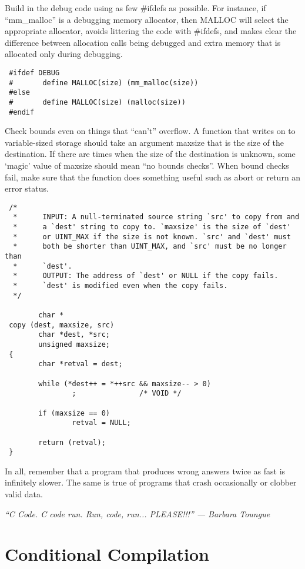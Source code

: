  Build in the debug code using as few \#ifdefs as possible. For instance, if
``mm\_malloc'' is a debugging memory allocator, then MALLOC will select the
appropriate allocator, avoids littering the code with \#ifdefs, and makes clear
the difference between allocation calls being debugged and extra memory that is
allocated only during debugging. 

\begin{verbatim}
 #ifdef DEBUG
 #       define MALLOC(size) (mm_malloc(size))
 #else
 #       define MALLOC(size) (malloc(size))
 #endif
\end{verbatim}

 Check bounds even on things that ``can't'' overflow. A function that writes on
to variable-sized storage should take an argument maxsize that is the size of
the destination. If there are times when the size of the destination is
unknown, some `magic' value of maxsize should mean ``no bounds checks''. When
bound checks fail, make sure that the function does something useful such as
abort or return an error status. 

\begin{verbatim}
 /*
  *      INPUT: A null-terminated source string `src' to copy from and
  *      a `dest' string to copy to. `maxsize' is the size of `dest'
  *      or UINT_MAX if the size is not known. `src' and `dest' must
  *      both be shorter than UINT_MAX, and `src' must be no longer than
  *      `dest'.
  *      OUTPUT: The address of `dest' or NULL if the copy fails.
  *      `dest' is modified even when the copy fails.
  */

        char *
 copy (dest, maxsize, src)
        char *dest, *src;
        unsigned maxsize;
 {
        char *retval = dest;

        while (*dest++ = *++src && maxsize-- > 0)
                ;               /* VOID */

        if (maxsize == 0)
                retval = NULL;

        return (retval);
 }
\end{verbatim}

 In all, remember that a program that produces wrong answers twice as fast is
infinitely slower. The same is true of programs that crash occasionally or
clobber valid data. 

\bigskip\noindent
{\em ``C Code. C code run. Run, code, run... PLEASE!!!'' ---  Barbara Toungue}

\section{Conditional Compilation}

